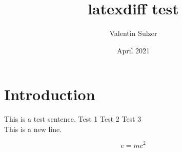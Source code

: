\documentclass{article}
\title{latexdiff test}
\author{Valentin Sulzer}
\date{April 2021}
\begin{document}
\maketitle

\section{Introduction}

This is a test sentence.
Test 1
Test 2
Test 3
\\This is a new line.

\begin{equation}
    e = mc^2
\end{equation}
\end{document}
